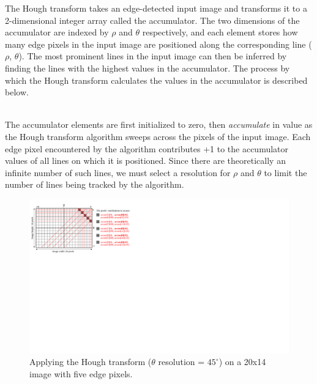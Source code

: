 \documentclass[epsfig,10pt,fullpage]{article}
\begin{document}
The Hough transform takes an edge-detected input image and transforms it to a 2-dimensional integer array called 
the accumulator.
The two dimensions of the accumulator are indexed by $\rho$ and $\theta$ respectively,
and each element stores how many edge pixels in the input image
are positioned along the corresponding line ($\rho$, $\theta$). 
The most prominent lines in the input image can then be inferred by finding the lines with the 
highest values in the accumulator.
The process by which the Hough transform calculates the values in the accumulator is described below.

~\\
The accumulator elements are first initialized to zero, then \textit{accumulate} in value as the Hough transform
algorithm sweeps across the pixels of the input image. 
Each edge pixel encountered by the algorithm contributes +1 to the accumulator values
of all lines on which it is positioned. 
Since there are theoretically an infinite number of such lines, we must select a resolution for $\rho$ and $\theta$ to
limit the number of lines being tracked by the algorithm.

\begin{figure}[H]
   \begin{center}
       \includegraphics[scale = 0.83]{figures/fig_line_20x14}
   \end{center}
   \caption{Applying the Hough transform ($\theta$ resolution = $45^\circ$) on a 20x14 image with five edge pixels.}
	\label{fig:hough_demonstration}
\end{figure}
\end{document}

